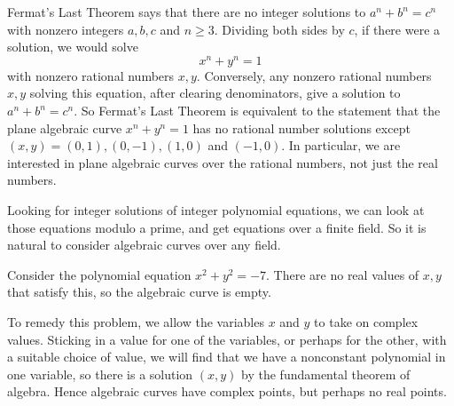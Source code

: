 \begin{example}
Fermat's Last Theorem says that there are no integer solutions to \(a^n+b^n=c^n\) with nonzero integers \(a,b,c\) and \(n\ge 3\).
Dividing both sides by \(c\), if there were a solution, we would solve 
\[
x^n+y^n=1
\]
with nonzero rational numbers \(x,y\).
Conversely, any nonzero rational numbers \(x,y\) solving this equation, after clearing denominators, give a solution to \(a^n+b^n=c^n\).
So Fermat's Last Theorem is equivalent to the statement that the plane algebraic curve \(x^n+y^n=1\) has no rational number solutions except \((x,y)=(0,1), (0,-1), (1,0)\) and \((-1,0)\).
In particular, we are interested in plane algebraic curves over the rational numbers, not just the real numbers.
\end{example}
\begin{example}
Looking for integer solutions of integer polynomial equations, we can look at those equations modulo a prime, and get equations over a finite field. 
So it is natural to consider algebraic curves over any field.
\end{example}
\begin{example}
Consider the polynomial equation \(x^2+y^2=-7\).
There are no real values of \(x,y\) that satisfy this, so the algebraic curve is empty.
\end{example}
To remedy this problem, we allow the variables \(x\) and \(y\) to take on complex values.
Sticking in a value for one of the variables, or perhaps for the other, with a suitable choice of value, we will find that we have a nonconstant polynomial in one variable, so there is a solution \((x,y)\) by the fundamental theorem of algebra.
Hence algebraic curves have complex points, but perhaps no real points.

